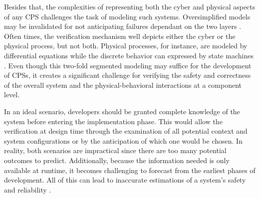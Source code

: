 Besides that, the complexities of representing both the cyber and physical aspects of any CPS challenges the task of modeling such systems. Oversimplified models may be invalidated for not anticipating failures dependant on the two layers \cite{2014PerceptionsSOTAV&VCPS}. Often times, the verification mechanism well depicts either the cyber or the physical process, but not both. Physical processes, for instance, are modeled by differential equations while the discrete behavior can expressed by state machines \cite{Baheti2019CyberPhysicalS}. Even though this two-fold segmented modeling may suffice for the development of CPSs, it creates a significant challenge for verifying the safety and correctness of the overall system and the physical-behavioral interactions at a component level.

In an ideal scenario, developers should be granted complete knowledge of the system before entering the implementation phase. This would allow the verification at design time through the examination of all potential context and system configurations or by the anticipation of which one would be chosen. In reality, both scenarios are impractical since there are too many potential outcomes to predict. Additionally, because the information needed is only available at runtime, it becomes challenging to forecast from the earliest phases of development. All of this can lead to inaccurate estimations of a system's safety and reliability \cite{2014PerceptionsSOTAV&VCPS}.


